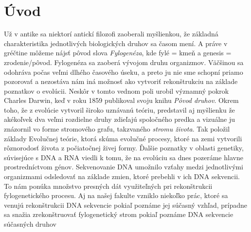 \chapter*{Úvod}
Už v antike sa niektorí antickí filozofi zaoberali myšlienkou, že základná charakteristika jednotlivých biologických druhov sa časom mení.
A práve v gréčtine môžeme nájsť pôvod slova \emph{Fylogenéza}, kde fylé = kmeň a genesis = zrodenie/pôvod.
Fylogenéza sa zaoberá vývojom druhu organizmov. Väčšinou sa odohráva počas veľmi dlhého časového úseku, 
a preto ju nie sme schopní priamo pozorovať a nezostáva nám iná možnosť ako vytvoriť rekonštrukciu na základe poznatkov o evolúcii.
Neskôr v tomto vednom poli urobil významný pokrok Charles Darwin, keď v roku 1859 publikoval svoju knihu \emph{Pôvod druhov}.
Okrem toho, že z evolúcie vytvoril široko uznávanú teóriu, predstavil aj myšlienku že akékoľvek dva veľmi rozdielne
druhy zdieľajú spoločného predka a vizuálne ju znázornil vo forme stromového grafu, takzvaného \emph{stromu života}.
Tak položil základy Evolučnej teórie, ktorá skúma evolučné procesy, ktoré
na zemi vytvorili rôznorodosť života z počiatočnej živej formy. 
Ďalšie poznatky v oblasti genetiky, súvisejúce s DNA a RNA viedli k tomu, že na evolúciu sa
dnes pozeráme hlavne prostredníctvom génov.
Sekvenovanie DNA umožnilo vzťahy medzi jednotlivými organizmami odsledovať na základe zmien, ktoré prebehli v ich DNA sekvencii.
To nám ponúka množstvo presných dát využiteľných pri rekonštrukcii fylogenetického procesu.
Aj na našej fakulte vzniklo niekoľko prác, ktoré sa venujú rekonštrukcii DNA sekvencie pokiaľ poznáme jej súčasný vzhľad,
prípadne sa snažia zrekonštruovať fylogenetický strom pokiaľ poznáme DNA sekvencie súčasných druhov 

